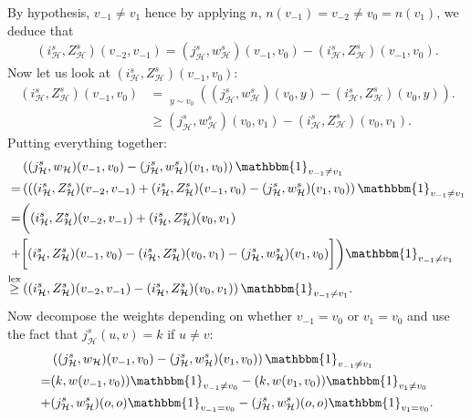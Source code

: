 \documentclass[10pt,a4paper]{amsart}
\DeclareMathOperator{\lex}{lex}
\DeclareMathOperator*{\maxlex}{\overset{\lex}{\max}}
\begin{document}
By hypothesis, $v_{-1} \neq v_{1}$ hence by applying $n$, $n(v_{-1})=v_{-2} \neq v_0=n(v_1)$, we deduce that 
\begin{align*}
    (i^s_{\mathcal{H}},Z^s_{\mathcal{H}})(v_{-2},v_{-1})=(j_{\mathcal{H}}^s,w_{\mathcal{H}}^s)(v_{-1},v_{0})-(i^s_{\mathcal{H}},Z^s_{\mathcal{H}})(v_{-1},v_0).
\end{align*}
Now let us look at $(i^s_{\mathcal{H}},Z^s_{\mathcal{H}})(v_{-1},v_0)$:
\begin{equation}
\begin{aligned}\label{eq:aldous2}
    (i^s_{\mathcal{H}},Z^s_{\mathcal{H}})(v_{-1},v_0) &= \underset{{ y \sim v_0}}{\maxlex}\left( (j_{\mathcal{H}}^s,w_{\mathcal{H}}^s)(v_0,y)-(i^s_{\mathcal{H}},Z^s_{\mathcal{H}})(v_0,y) \right). \\
    &\geq (j_{\mathcal{H}}^s,w_{\mathcal{H}}^s)(v_0,v_1)-(i^s_{\mathcal{H}},Z^s_{\mathcal{H}})(v_0,v_1).
\end{aligned}
\end{equation}
Putting everything together:
\begin{equation}\label{eq:aldous4}
\begin{aligned}
    &\left((j_{\mathcal{H}}^s,w_{\mathcal{H}})(v_{-1},v_0)-(j_{\mathcal{H}}^s,w_{\mathcal{H}}^s)(v_{1},v_0) \right)\mathbbm{1}_{v_{-1} \neq v_1} \\
    =&\left(((i^s_{\mathcal{H}},Z^s_{\mathcal{H}})(v_{-2},v_{-1})+(i^s_{\mathcal{H}},Z^s_{\mathcal{H}})(v_{-1},v_0)-(j_{\mathcal{H}}^s,w_{\mathcal{H}}^s)(v_{1},v_0)\right)\mathbbm{1}_{v_{-1} \neq v_1} \\
    =&\bigg((i^s_{\mathcal{H}},Z^s_{\mathcal{H}})(v_{-2},v_{-1})+(i^s_{\mathcal{H}},Z^s_{\mathcal{H}})(v_0,v_1) \\
    +&\bigg[(i^s_{\mathcal{H}},Z^s_{\mathcal{H}})(v_{-1},v_0)-(i^s_{\mathcal{H}},Z^s_{\mathcal{H}})(v_0,v_1)-(j_{\mathcal{H}}^s,w_{\mathcal{H}}^s)(v_{1},v_0)\bigg]\bigg)\mathbbm{1}_{v_{-1} \neq v_1} \\
    \overset{\lex}{\geq}&\left((i^s_{\mathcal{H}},Z^s_{\mathcal{H}})(v_{-2},v_{-1}) -(i^s_{\mathcal{H}},Z^s_{\mathcal{H}})(v_{0},v_{1})\right)\mathbbm{1}_{v_{-1} \neq v_1} .
\end{aligned}
\end{equation}
Now decompose the weights depending on whether $v_{-1}=v_0$ or $v_{1}=v_0$ and use the fact that $j_{\mathcal{H}}^s(u,v)=k$  if $u \neq v$:
\begin{align*}
    &\left((j_{\mathcal{H}}^s,w_{\mathcal{H}})(v_{-1},v_0)-(j_{\mathcal{H}}^s,w_{\mathcal{H}}^s)(v_{1},v_0) \right)\mathbbm{1}_{v_{-1} \neq v_1} \\
    =&(k,w(v_{-1},v_{0}))\mathbbm{1}_{v_{-1}\neq v_{0}}-(k,w(v_1,v_{0}))\mathbbm{1}_{v_1 \neq v_{0}} \\
    +&(j_{\mathcal{H}}^s,w_{\mathcal{H}}^s)(o,o)\mathbbm{1}_{v_{-1}=v_{0}}-(j_{\mathcal{H}}^s,w_{\mathcal{H}}^s)(o,o)\mathbbm{1}_{v_{1}=v_{0}}.
\end{align*}
\end{document}
